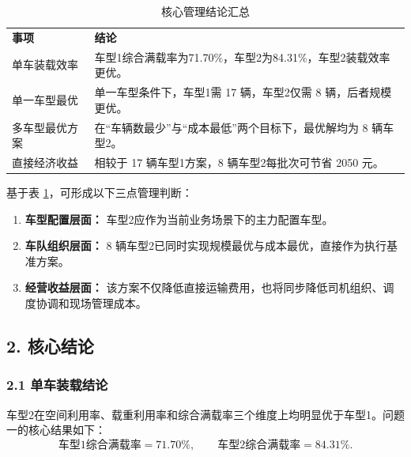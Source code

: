 \documentclass{MMCStyle}
\begin{document}
\begin{table}[H]
\centering
\caption{核心管理结论汇总}
\label{tab:p3_summary_compact}
\normalsize
\setlength{\tabcolsep}{2pt}
\renewcommand{\arraystretch}{0.8} %
\begin{tabularx}{1\textwidth}{>{\raggedright\arraybackslash}p{3.2cm} >{\raggedright\arraybackslash}X}
\rowcolor{ReportTeal}
\color{white}\textbf{事项} & \color{white}\textbf{结论} \\ 
\noalign{\global\renewcommand{\arraystretch}{1.15}} %
\rowcolor{white}
单车装载效率\rule{0pt}{2.7ex} & 车型1综合满载率为71.70\%，车型2为84.31\%，车型2装载效率更优。 \\
\rowcolor{ReportStripe}
单一车型最优\rule{0pt}{2.7ex} & 单一车型条件下，车型1需 17 辆，车型2仅需 8 辆，后者规模更优。 \\
\rowcolor{white}
多车型最优方案\rule{0pt}{2.7ex} & 在“车辆数最少”与“成本最低”两个目标下，最优解均为 8 辆车型2。 \\
\rowcolor{ReportStripe}
直接经济收益\rule{0pt}{2.7ex} & 相较于 17 辆车型1方案，8 辆车型2每批次可节省 2050 元。 \\
\end{tabularx}
\end{table}

\noindent
基于表 \ref{tab:p3_summary_compact}，可形成以下三点管理判断：
\begin{enumerate}
\item \textbf{车型配置层面：} 车型2应作为当前业务场景下的主力配置车型。
\item \textbf{车队组织层面：} 8 辆车型2已同时实现规模最优与成本最优，直接作为执行基准方案。
\item \textbf{经营收益层面：} 该方案不仅降低直接运输费用，也将同步降低司机组织、调度协调和现场管理成本。
\end{enumerate}

\subsection*{2. 核心结论}

\subsubsection*{2.1 单车装载结论}

\noindent
车型2在空间利用率、载重利用率和综合满载率三个维度上均明显优于车型1。问题一的核心结果如下：
\begin{equation}
\text{车型1综合满载率}=71.70\%,\qquad
\text{车型2综合满载率}=84.31\%.
\end{equation}
\end{document}
